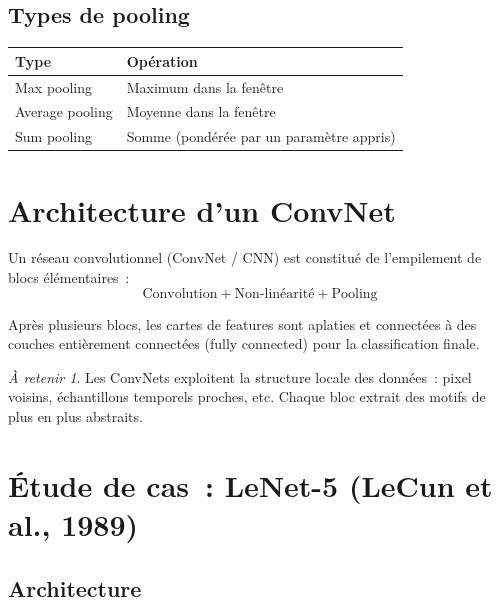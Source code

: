 \documentclass[a4paper,11pt]{article}
\theoremstyle{definition}
\theoremstyle{remark}
\newtheorem*{important}{\`A retenir}
\begin{document}
\subsection{Types de pooling}

\begin{tabular}{ll}
\toprule
Type & Op\'eration \\
\midrule
Max pooling & Maximum dans la fen\^etre \\
Average pooling & Moyenne dans la fen\^etre \\
Sum pooling & Somme (pond\'er\'ee par un param\`etre appris) \\
\bottomrule
\end{tabular}

\section{Architecture d'un ConvNet}

Un r\'eseau convolutionnel (ConvNet / CNN) est constitu\'e de
l'empilement de blocs \'el\'ementaires~:
\begin{equation}
  \boxed{\text{Convolution} + \text{Non-lin\'earit\'e} +
    \text{Pooling}}
\end{equation}

\noindent Apr\`es plusieurs blocs, les cartes de features sont
aplaties et connect\'ees \`a des couches enti\`erement connect\'ees
(fully connected) pour la classification finale.

\begin{important}
  Les ConvNets exploitent la structure locale des donn\'ees~:
  pixel voisins, \'echantillons temporels proches, etc. Chaque
  bloc extrait des motifs de plus en plus abstraits.
\end{important}

\section{\'Etude de cas~: LeNet-5 (LeCun et al., 1989)}

\subsection{Architecture}
\end{document}
